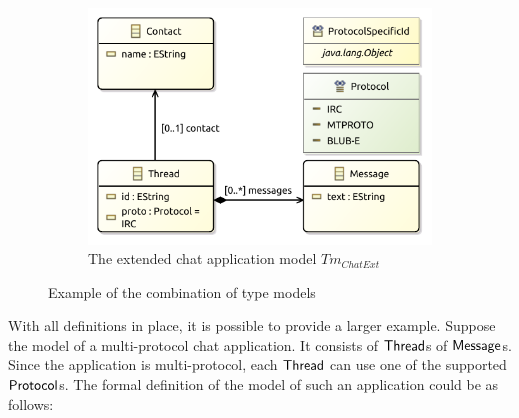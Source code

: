 \begin{figure}
\begin{subfigure}{\textwidth}
        \centering
        \includegraphics{images/04_transformation_framework/type_models_combination/chat_combined.pdf}
        \caption{The extended chat application model $Tm_{ChatExt}$}
        \label{fig:transformation_framework:type_models_and_type_graphs:combining_type_models:combine_example_tmod12}
    \end{subfigure}
    \caption{Example of the combination of type models}
    \label{fig:transformation_framework:type_models_and_type_graphs:combining_type_models:combine_example}
\end{figure}

With all definitions in place, it is possible to provide a larger example. Suppose the model of a multi-protocol chat application. It consists of $\mathsf{Thread}$s of $\mathsf{Message}$s. Since the application is multi-protocol, each $\mathsf{Thread}$ can use one of the supported $\mathsf{Protocol}$s. The formal definition of the model of such an application could be as follows:

